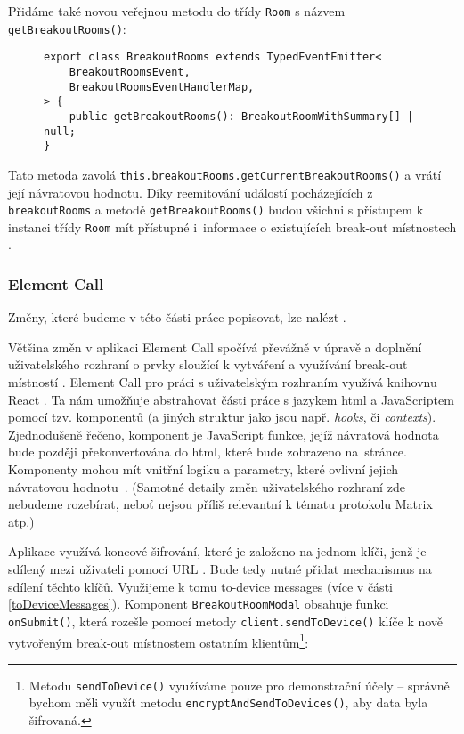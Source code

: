 Přidáme také
novou veřejnou metodu do třídy \texttt{Room} s názvem
\texttt{getBreakoutRooms()}:

\begin{figure}[H]
    \begin{verbatim}
export class BreakoutRooms extends TypedEventEmitter<
	BreakoutRoomsEvent,
	BreakoutRoomsEventHandlerMap,
> {
	public getBreakoutRooms(): BreakoutRoomWithSummary[] | null;
}
	\end{verbatim}
\end{figure}

Tato metoda zavolá
\texttt{this.breakoutRooms.getCurrentBreakoutRooms()} a vrátí
její návratovou hodnotu. Díky reemitování událostí pocházejících z
\texttt{breakoutRooms} a metodě
\texttt{getBreakoutRooms()} budou všichni s přístupem k instanci
třídy \texttt{Room} mít přístupné i~informace o existujících
break-out místnostech \parencite{GitHub-MatrixJSSDK-BreakoutRooms}.

\subsubsection{Element Call}

Změny, které budeme v této části práce popisovat, lze nalézt  \iftoggle{school}{v příloze (viz
    část
    \ref{attachment})}{\href{https://github.com/vector-im/element-call/pull/1615/}{zde}
    \parencite{GitHub-ElementCall-BreakoutRooms}}.

Většina změn v aplikaci Element Call spočívá převážně v úpravě a doplnění
uživatelského rozhraní o prvky sloužící k vytváření a využívání break-out
místností \parencite{GitHub-ElementCall-BreakoutRooms}. Element Call pro práci s
uživatelským rozhraním využívá knihovnu React \parencite{GitHub-ElementCall}. Ta
nám umožňuje abstrahovat části práce s jazykem \gls{html} a JavaScriptem pomocí
tzv. komponentů (a jiných struktur jako jsou např. \textit{hooks}, či
\textit{contexts}). Zjednodušeně řečeno, komponent je JavaScript funkce, jejíž
návratová hodnota bude později překonvertována do \gls{html}, které bude
zobrazeno na~stránce. Komponenty mohou mít vnitřní logiku a parametry, které
ovlivní jejich návratovou hodnotu~\parencite{React-Homepage}. (Samotné detaily
změn uživatelského rozhraní zde nebudeme rozebírat, neboť nejsou příliš
relevantní k tématu protokolu Matrix atp.)

Aplikace využívá koncové šifrování, které je založeno na jednom klíči, jenž je
sdílený mezi uživateli pomocí URL
\parencite{GitHub-ElementCall-CompleteSPAE2EEWork}. Bude tedy nutné přidat
mechanismus na sdílení těchto klíčů. Využijeme k tomu to-device messages (více v
části \ref{toDeviceMessages}). Komponent
\texttt{BreakoutRoomModal} obsahuje funkci
\texttt{onSubmit()}, která rozešle pomocí metody
\texttt{client.sendToDevice()} klíče k nově vytvořeným break-out
místnostem ostatním klientům\footnote{Metodu
    \texttt{sendToDevice()} využíváme pouze pro demonstrační účely
    -- správně bychom měli využít metodu
    \texttt{encryptAndSendToDevices()}, aby data byla šifrovaná.}:

